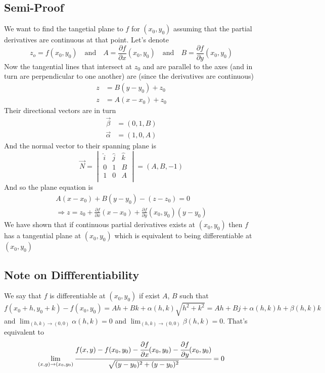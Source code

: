 \documentclass{article}
\begin{document}
	\subsection{Semi-Proof}
	We want to find the tangetial plane to $f$ for $(x_0,y_0)$ 
	assuming that the partial derivatives are continuous at that point. 
	Let's denote
	\[
		z_o=f(x_0,y_0)\quad\mathrm{and}\quad A = 
		\frac{\partial f}{\partial x}(x_0,y_0) \quad
		\mathrm{and} \quad B = \frac{\partial f}{\partial y}(x_0,y_0)
	\]
	Now the tangential lines that intersect at $z_0$ and are parallel 
	to the axes (and in turn are perpendicular to one another) 
	are (since the derivatives are continuous)
	\begin{align*} 
		z &=  B(y-y_0)+z_0 \\ 
		z &=  A(x-x_0)+z_0
	\end{align*}
	Their directional vectors are in turn
	\begin{align*} 
		\vec{\beta} &=  (0,1,B) \\ 
		\vec{\alpha} &=  (1,0,A)
	\end{align*}
	And the normal vector to their spanning plane is
	\[
	\vec{N} = \begin{vmatrix}
		\hat{i} & \hat{j} & \hat{k}\\
		0 & 1 & B\\
		1 & 0 & A\\
	\end{vmatrix}
	 = (A,B,-1)
	\]
	And so the plane equation is
	\begin{align*}
		A(x-x_0) + B(y-y_0) - (z-z_0) = 0 \\
		\Rightarrow z = z_0 + \frac{\partial f}{\partial x}(x-x_0) + \frac{\partial f}{\partial y}(x_0,y_0)(y-y_0)
	\end{align*}
	We have shown that if continuous partial derivatives exists at $(x_0,y_0)$ 
	then $f$ has a tangential plane at $(x_0,y_0)$ which is equivalent to 
	being differentiable at $(x_0,y_0)$
	
	\subsection{Note on Diffferentiability}
	We say that $f$ is differentiable at $(x_0,y_0)$ if exist $A$, $B$ such that
	\[
		f(x_0+h,y_0+k)-f(x_0,y_0) 
		= Ah + Bk + \alpha(h,k)\sqrt{h^2+k^2}
		= Ah + Bj + \alpha(h,k)h + \beta(h,k)k
	\]
	and $\lim_{(h,k)\to(0,0)}{\alpha(h,k)}=0$ and $\lim_{(h,k)\to (0,0)}{\beta(h,k)}=0$. That's equivalent to
	\[
		\lim_{(x,y)\to(x_0,y_0)}{\cfrac{f(x,y)-f(x_0,y_0)-\cfrac{\partial f}{\partial x}(x_0,y_0)-\cfrac{\partial f}{\partial y}(x_0,y_0)}{\sqrt{(y-y_0)^2+(y-y_0)^2}}} = 0
	\]
\end{document}
